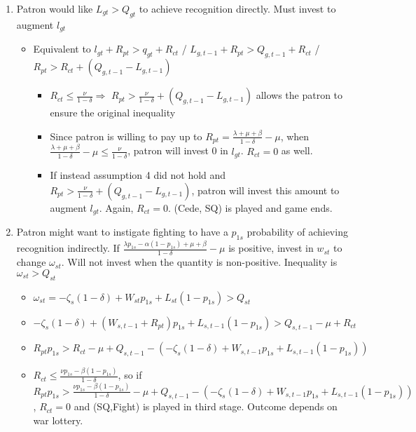 \documentclass[12pt]{article}
\newcommand{\de}{\delta}
\begin{document}
\begin{enumerate}
\begin{itemize}
\begin{itemize}
\begin{enumerate}
\begin{itemize}
								\end{itemize}
						\end{enumerate}
				\end{itemize}
		\end{itemize}	
	\item Patron would like $L_{gt} > Q_{gt}$ to achieve recognition directly. Must invest to augment $l_{gt}$
		\begin{itemize}
			\item Equivalent to $l_{gt} + R_{pt} > q_{gt} + R_{ct}$ / $L_{g,t-1} + R_{pt} > Q_{g,t-1} + R_{ct}$ / $R_{pt} > R_{ct} + \left( Q_{g,t-1} - L_{g,t-1}\right)$
				\begin{itemize}
					\item $R_{ct} \leq \frac{\nu}{1-\de} \Rightarrow$ $R_{pt} > \frac{\nu}{1-\de} + \left( Q_{g,t-1} - L_{g,t-1}\right)$ allows the patron to ensure the original inequality
					\item Since patron is willing to pay up to $R_{pt} = \frac{\lambda +\mu + \beta}{1-\de} - \mu$, when $\frac{\lambda +\mu + \beta}{1-\de} -\mu \leq \frac{\nu}{1-\de}$, patron will invest 0 in $l_{gt}$. $R_{ct} = 0$ as well.
					\item If instead assumption 4 did not hold and $R_{pt} > \frac{\nu}{1-\de} + \left( Q_{g,t-1} - L_{g,t-1}\right)$, patron will invest this amount to augment $l_{gt}$. Again, $R_{ct} = 0$. (Cede, SQ) is played and game ends.
				\end{itemize}
		\end{itemize}
	\item Patron might want to instigate fighting to have a $p_{1s}$ probability of achieving recognition indirectly. If $\frac{\lambda p_{1s} - \alpha (1-p_{1s}) + \mu + \beta}{1 - \de} -\mu$ is positive, invest in $w_{st}$ to change $\omega_{st}$. Will not invest when the quantity is non-positive. Inequality is $\omega_{st} > Q_{st}$
		\begin{itemize}
			\item $\omega_{st} = -\zeta_{s}(1-\de) + W_{st}p_{1s} + L_{st}(1-p_{1s}) > Q_{st}$
			\item $-\zeta_{s}(1-\de) + (W_{s,t-1}+R_{pt})p_{1s} + L_{s,t-1}(1-p_{1s}) > Q_{s,t-1} - \mu + R_{ct}$
			\item $R_{pt}p_{1s} > R_{ct} - \mu + Q_{s,t-1} - \left(-\zeta_{s}(1-\de) + W_{s,t-1}p_{1s} + L_{s,t-1}(1-p_{1s})\right)$
			\item $R_{ct} \leq \frac{\nu p_{1s} - \beta (1-p_{1s})}{1 -\de}$, so if $R_{pt}p_{1s} > \frac{\nu p_{1s} - \beta (1-p_{1s})}{1 -\de} - \mu + Q_{s,t-1} - \left(-\zeta_{s}(1-\de) + W_{s,t-1}p_{1s} + L_{s,t-1}(1-p_{1s})\right)$, $R_{ct}=0$ and (SQ,Fight) is played in third stage. Outcome depends on war lottery.

\end{itemize}
\end{enumerate}
\end{document}
